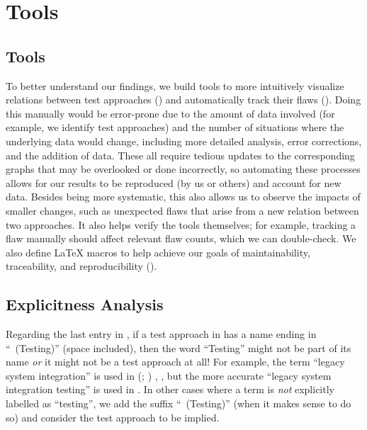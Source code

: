 \ifnotpaper
    \section{Tools}
\else
    \subsection{Tools}
\fi
\label{tools}

\ifnotpaper
    To better understand our findings, we build tools to more intuitively
    visualize relations between test approaches () and
    automatically track their flaws (). Doing
    this manually would be error-prone due to the amount of data involved (for
    example, we identify \approachCount{} test approaches) and the number of
    situations where the underlying data would change, including more detailed
    analysis, error corrections, and the addition of data. These all require
    tedious updates to the corresponding graphs that may be overlooked or done
    incorrectly, so automating these processes allows for our results to be
    reproduced (by us or others) and account for new data. Besides being more
    systematic, this also allows us to observe the impacts of smaller changes,
    such as unexpected flaws that arise from a new relation between two
    approaches. It also helps verify the tools themselves; for example,
    tracking a flaw manually should affect relevant flaw counts, which we can
    double-check. We also define \LaTeX{} macros to help achieve our goals of
    maintainability, traceability, and reproducibility ().

    \subsection{Explicitness Analysis}\label{exp-analysis}
    

    Regarding the last entry in , if a test approach in
    \ourApproachGlossary{} has a name ending in ``~(Testing)'' (space
    included), then the word ``Testing'' might not be part of its name
    \emph{or} it might not be a test approach at all! For example, the term
    ``legacy system integration'' is used in \ifnotpaper
        \citeauthor{Gerrard2000a} (\citeyear[pp.~12\==13, Tab.~2]{Gerrard2000a};
        \citeyear[Tab.~1]{Gerrard2000b})\else
        \cite[pp.~12\==13, Tab.~2]{Gerrard2000a},
        \cite[Tab.~1]{Gerrard2000b}\fi, but the more accurate
    ``legacy system integration testing'' is used in
    \citeyearpar[pp.~30\==31]{Gerrard2000b}. In other cases where a
    term is \emph{not} explicitly labelled as ``testing'', we add the
    suffix ``~(Testing)'' (when it makes sense to do so) and consider
    the test approach to be implied.

